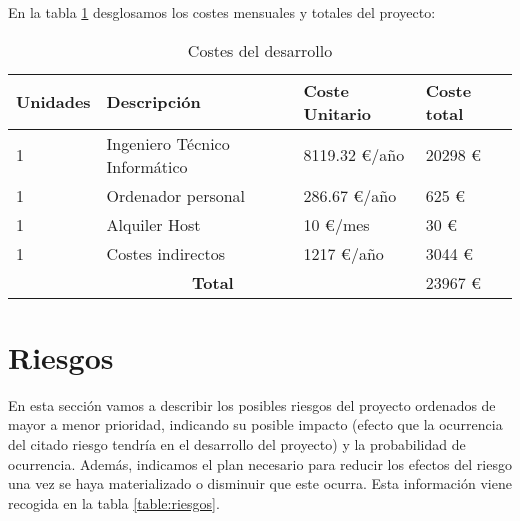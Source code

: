 En la tabla \ref{table:costes} desglosamos los costes mensuales y totales del proyecto:

\begin{table}[!hbt]
	\begin{center}
		\begin{tabular}{|p{2cm}|p{6cm}|p{2.5cm}|p{2.5cm}|}
			\hline
			\textbf{Unidades} & \textbf{Descripción} & \textbf{Coste Unitario} & \textbf{Coste total}\\
			\hline
			1 & Ingeniero Técnico Informático & 8119.32 \euro/año & 20298 \euro\\
			\hline
			1 & Ordenador personal & 286.67 \euro/año & 625 \euro\\
			\hline
			1 & Alquiler Host & 10 \euro/mes & 30 \euro\\
			\hline
			1 & Costes indirectos & 1217 \euro/año & 3044 \euro\\
			\hline
			\multicolumn{3}{|c|}{\textbf{Total}} & 23967 \euro\\
			\hline
		\end{tabular}
		\caption{Costes del desarrollo}
		\label{table:costes}
	\end{center}
\end{table}



\section{Riesgos}
En esta sección vamos a describir los posibles riesgos del proyecto ordenados de mayor a menor prioridad, indicando su posible impacto (efecto que la ocurrencia del citado riesgo tendría en el desarrollo del proyecto) y la probabilidad de ocurrencia. Además, indicamos el plan necesario para reducir los efectos del riesgo una vez se haya materializado o disminuir que este ocurra. Esta información viene recogida en la tabla \ref{table:riesgos}.

